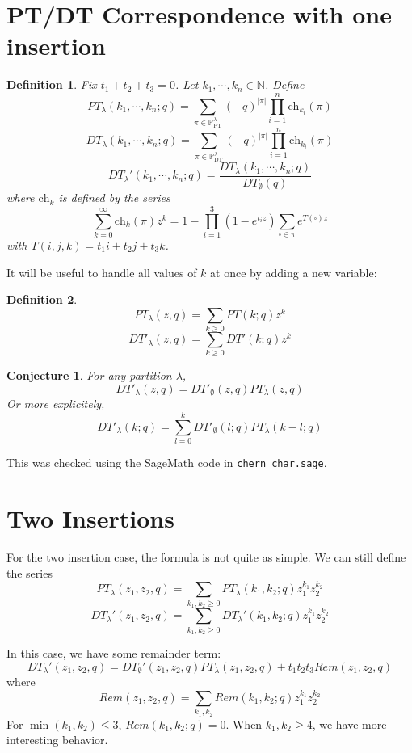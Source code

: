 \documentclass{amsart}
\newtheorem{defn}{Definition}
\newtheorem{conj}{Conjecture}
\newcommand{\pt}[1]{\mathbb{P}_\mathrm{PT}^{#1}}
\newcommand{\dt}[1]{\mathbb{P}_\mathrm{DT}^{#1}}
\newcommand{\NN}{\mathbb{N}}
\newcommand{\ch}{\mathrm{ch}}
\begin{document}
\section{PT/DT Correspondence with one insertion}
\begin{defn}
  Fix $t_1 + t_2 + t_3 = 0$.  Let $k_1, \cdots, k_n \in \NN$.
  Define
  \[
    PT_\lambda(k_1, \cdots, k_n; q)
    = \sum_{\pi\in\pt{\lambda}} (-q)^{|\pi|}
    \prod_{i = 1}^n \ch_{k_i}(\pi)
  \]
  \[
    DT_\lambda(k_1, \cdots, k_n; q)
    = \sum_{\pi\in\dt{\lambda}} (-q)^{|\pi|}
    \prod_{i = 1}^n \ch_{k_i}(\pi)
  \]
  \[
    DT_\lambda'(k_1, \cdots, k_n; q)
    = \frac{DT_\lambda(k_1, \cdots, k_n; q)}{DT_\emptyset(q)}
  \]
  where $\ch_k$ is defined by the series
  \[
    \sum_{k = 0}^\infty \ch_k(\pi)z^k =
    1 - \prod_{i=1}^3\left(1 - e^{t_i z}\right)
    \sum_{\square\in\pi} e^{T(\square)z}
  \]
  with $T(i, j, k) = t_1i + t_2j + t_3k$.
\end{defn}
It will be useful to handle all values of $k$ at once by adding a new
variable:
\begin{defn}
  \[ PT_\lambda(z, q) = \sum_{k \geq 0} PT(k; q)z^k \]
  \[ DT'_\lambda(z, q) = \sum_{k \geq 0} DT'(k; q)z^k \]
\end{defn}
\begin{conj}
  For any partition $\lambda$,
  \[ DT'_\lambda(z, q) = DT'_\emptyset(z, q)PT_\lambda(z, q) \]
  Or more explicitely,
  \[ DT'_\lambda(k; q) =
    \sum_{l = 0}^k DT'_\emptyset(l; q)PT_\lambda(k - l; q) \]
\end{conj}
This was checked using the SageMath code in \texttt{chern\_char.sage}.

\section{Two Insertions}
For the two insertion case, the formula is not quite as simple.  We
can still define the series
\[
  PT_\lambda(z_1, z_2, q) =
  \sum_{k_1, k_2 \geq 0} PT_\lambda(k_1, k_2; q) z_1^{k_1} z_2^{k_2}
\]
\[
  DT_\lambda'(z_1, z_2, q) =
  \sum_{k_1, k_2 \geq 0} DT_\lambda'(k_1, k_2; q) z_1^{k_1} z_2^{k_2}
\]

In this case, we have some remainder term:
\[
  DT_\lambda'(z_1, z_2, q)
  = DT_\emptyset'(z_1, z_2, q) PT_\lambda(z_1, z_2, q)
  + t_1t_2t_3 Rem(z_1, z_2, q)
\]
where
\[
  Rem(z_1, z_2, q) = \sum_{k_1, k_2} Rem(k_1, k_2; q)z_1^{k_1}z_2^{k_2}
\]
For $\min(k_1, k_2) \leq 3$, $Rem(k_1, k_2; q) = 0$.  When $k_1, k_2 \geq 4$, we have more interesting behavior.
\end{document}
